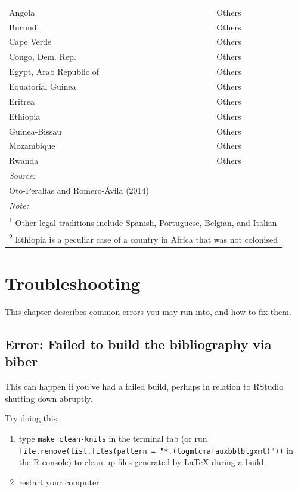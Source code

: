 \documentclass[a4paper, nobind]{templates/ociamthesis}
\providecommand{\tightlist}{%
  \setlength{\itemsep}{0pt}\setlength{\parskip}{0pt}}
\begin{document}
\begin{table}
\begin{tabular}[t]{ll}
Angola & Others\\
Burundi & Others\\
Cape Verde & Others\\
\addlinespace
Congo, Dem. Rep. & Others\\
Egypt, Arab Republic of & Others\\
Equatorial Guinea & Others\\
Eritrea & Others\\
Ethiopia & Others\\
\addlinespace
Guinea-Bissau & Others\\
Mozambique & Others\\
Rwanda & Others\\
\bottomrule
\multicolumn{2}{l}{\rule{0pt}{1em}\textit{Source: }}\\
\multicolumn{2}{l}{\rule{0pt}{1em}Oto-Peralías and Romero-Ávila (2014)}\\
\multicolumn{2}{l}{\rule{0pt}{1em}\textit{Note: }}\\
\multicolumn{2}{l}{\rule{0pt}{1em}\textsuperscript{1} Other legal traditions include Spanish, Portuguese, Belgian, and Italian}\\
\multicolumn{2}{l}{\rule{0pt}{1em}\textsuperscript{2} Ethiopia is a peculiar case of a country in Africa that was not colonised}\\
\end{tabular}
\end{table}

\hypertarget{troubleshooting}{%
\chapter{Troubleshooting}\label{troubleshooting}}

This chapter describes common errors you may run into, and how to fix them.

\hypertarget{error-failed-to-build-the-bibliography-via-biber}{%
\section{Error: Failed to build the bibliography via biber}\label{error-failed-to-build-the-bibliography-via-biber}}

This can happen if you've had a failed build, perhaps in relation to RStudio shutting down abruptly.

Try doing this:

\begin{enumerate}
\def\labelenumi{\arabic{enumi}.}
\tightlist
\item
  type \texttt{make\ clean-knits} in the terminal tab (or run \texttt{file.remove(list.files(pattern\ =\ "*.(log\textbar{}mtc\textbar{}maf\textbar{}aux\textbar{}bbl\textbar{}blg\textbar{}xml)"))} in the R console) to clean up files generated by LaTeX during a build
\item
  restart your computer
\end{enumerate}
\end{document}

